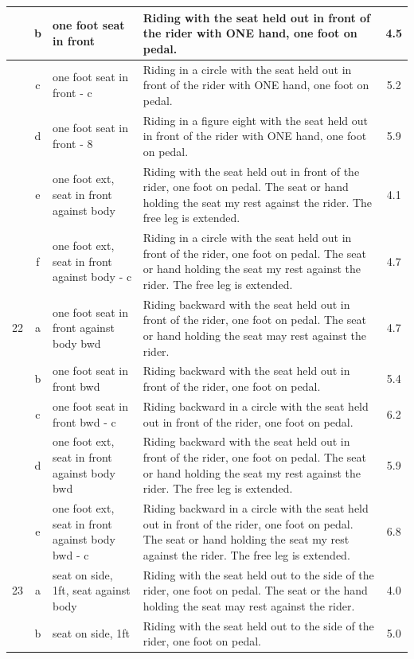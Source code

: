 \begin{longtable}{|r|c|p{4cm}|p{8cm}|c|}
\hline
  & b & one foot seat in front  & Riding with the seat held out in front of the rider with ONE hand, one foot on pedal. & 4.5 \\ 
\hline
  & c & one foot seat in front - c  & Riding in a circle with the seat held out in front of the rider with ONE hand, one foot on pedal. & 5.2 \\ 
\hline
  & d & one foot seat in front - 8  & Riding in a figure eight with the seat held out in front of the rider with ONE hand, one foot on pedal. & 5.9 \\ 
\hline
  & e & one foot ext, seat in front against body  & Riding with the seat held out in front of the rider, one foot on pedal. The seat or hand holding the seat my rest against the rider. The free leg is extended.  & 4.1 \\ 
\hline
  & f & one foot ext, seat in front against body - c  & Riding in a circle with the seat held out in front of the rider, one foot on pedal. The seat or hand holding the seat my rest against the rider. The free leg is extended.  & 4.7 \\ 
\hline
22  & a & one foot seat in front against body bwd & Riding backward with the seat held out in front of the rider, one foot on pedal. The seat or hand holding the seat may rest against the rider.  & 4.7 \\ 
\hline
  & b & one foot seat in front bwd  & Riding backward with the seat held out in front of the rider, one foot on pedal.  & 5.4 \\ 
\hline
  & c & one foot seat in front bwd - c  & Riding backward in a circle with the seat held out in front of the rider, one foot on pedal.  & 6.2 \\ 
\hline
  & d & one foot ext, seat in front against body bwd  & Riding backward with the seat held out in front of the rider, one foot on pedal. The seat or hand holding the seat my rest against the rider. The free leg is extended. & 5.9 \\ 
\hline
  & e & one foot ext, seat in front against body bwd - c  & Riding backward in a circle with the seat held out in front of the rider, one foot on pedal. The seat or hand holding the seat my rest against the rider. The free leg is extended. & 6.8 \\ 
\hline
23  & a & seat on side, 1ft, seat against body  & Riding with the seat held out to the side of the rider, one foot on pedal. The seat or the hand holding the seat may rest against the rider.  & 4.0 \\ 
\hline
  & b & seat on side, 1ft & Riding with the seat held out to the side of the rider, one foot on pedal.  & 5.0 \\ 

\end{longtable}

